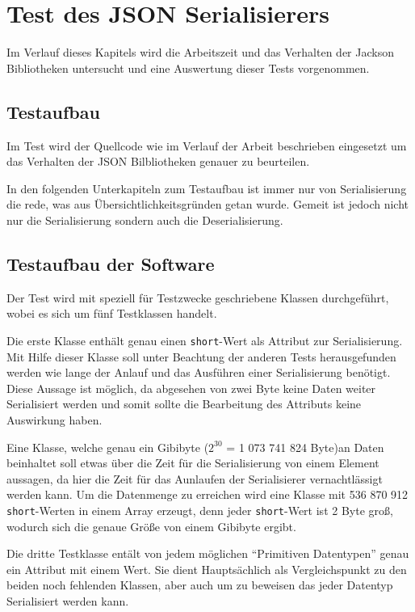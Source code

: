 \section{Test des JSON Serialisierers}
Im Verlauf dieses Kapitels wird die Arbeitszeit und das Verhalten der Jackson Bibliotheken untersucht und eine Auswertung dieser Tests vorgenommen.

\subsection{Testaufbau}
Im Test wird der Quellcode wie im Verlauf der Arbeit beschrieben eingesetzt um das Verhalten der JSON Bilbliotheken genauer zu beurteilen.

In den folgenden Unterkapiteln zum Testaufbau ist immer nur von Serialisierung die rede, was aus \"Ubersichtlichkeitsgr\"unden getan wurde. Gemeit ist jedoch nicht nur die Serialisierung sondern auch die Deserialisierung.

\subsection{Testaufbau der Software}
Der Test wird mit speziell f\"ur Testzwecke geschriebene Klassen durchgef\"uhrt, wobei es sich um f\"unf Testklassen handelt.

Die erste Klasse enth\"alt genau einen \texttt{short}-Wert als Attribut zur Serialisierung. Mit Hilfe dieser Klasse soll unter Beachtung der anderen Tests herausgefunden werden wie lange der Anlauf und das Ausf\"uhren einer Serialisierung ben\"otigt. Diese Aussage ist m\"oglich, da abgesehen von zwei Byte keine Daten weiter Serialisiert werden und somit sollte die Bearbeitung des Attributs keine Auswirkung haben.

Eine Klasse, welche genau ein Gibibyte ($2^{30}$ = 1 073 741 824 Byte)an Daten beinhaltet soll etwas \"uber die Zeit f\"ur die Serialisierung von einem Element aussagen, da hier die Zeit f\"ur das Aunlaufen der Serialisierer vernachtl\"assigt werden kann.
Um die Datenmenge zu erreichen wird eine Klasse mit 536 870 912 \texttt{short}-Werten in einem Array erzeugt, denn jeder \texttt{short}-Wert ist 2 Byte gro\ss{}, wodurch sich die genaue Gr\"o\ss{}e von einem Gibibyte ergibt.

Die dritte Testklasse ent\"alt von jedem m\"oglichen "`Primitiven Datentypen"' genau ein Attribut mit einem Wert. Sie dient Haupts\"achlich als Vergleichspunkt zu den beiden noch fehlenden Klassen, aber auch um zu beweisen das jeder Datentyp Serialisiert werden kann.

